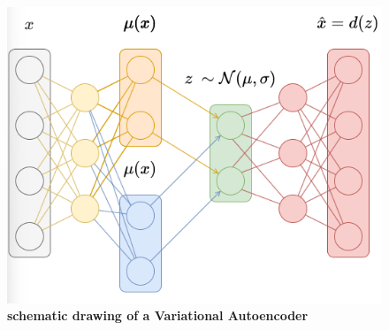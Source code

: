 \begin{figure}[t]
    \begin{center}
        \includegraphics[width=0.5\linewidth]{figures/background/VAE.png}
        \caption[Variational Autoencoder schematics]{\textbf{schematic drawing of a Variational Autoencoder}}
        \label{fig:Variational_Autoencoder_schematics}
    \end{center}
\end{figure}